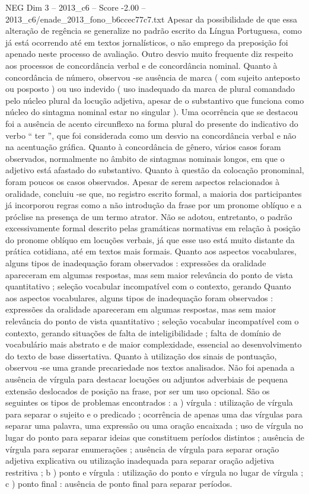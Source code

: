 \begin{textsample}{NEG Dim 3 – 2013\_c6 – Score -2.00 – 2013\_c6/enade\_2013\_fono\_b6ccec77c7.txt}
Apesar da possibilidade de que essa alteração de regência se generalize no padrão escrito da Língua Portuguesa, como já está ocorrendo até em textos jornalísticos, o não emprego da preposição foi apenado neste processo de avaliação.
Outro desvio muito frequente diz respeito aos processos de concordância verbal e de concordância nominal.
Quanto à concordância de número, observou -se ausência de marca ( com sujeito anteposto ou posposto ) ou uso indevido ( uso inadequado da marca de plural comandado pelo núcleo plural da locução adjetiva, apesar de o substantivo que funciona como núcleo do sintagma nominal estar no singular ).
Uma ocorrência que se destacou foi a ausência de acento circunflexo na forma plural do presente do indicativo do verbo “ ter ”, que foi considerada como um desvio na concordância verbal e não na acentuação gráfica.
Quanto à concordância de gênero, vários casos foram observados, normalmente no âmbito de sintagmas nominais longos, em que o adjetivo está afastado do substantivo.
Quanto à questão da colocação pronominal, foram poucos os casos observados.
Apesar de serem aspectos relacionados à oralidade, concluiu -se que, no registro escrito formal, a maioria dos participantes já incorporou regras como a não introdução da frase por um pronome oblíquo e a próclise na presença de um termo atrator.
Não se adotou, entretanto, o padrão excessivamente formal descrito pelas gramáticas normativas em relação à posição do pronome oblíquo em locuções verbais, já que esse uso está muito distante da prática cotidiana, até em textos mais formais.
Quanto aos aspectos vocabulares, alguns tipos de inadequação foram observados : expressões da oralidade apareceram em algumas respostas, mas sem maior relevância do ponto de vista quantitativo ; seleção vocabular incompatível com o contexto, gerando Quanto aos aspectos vocabulares, alguns tipos de inadequação foram observados : expressões da oralidade apareceram em algumas respostas, mas sem maior relevância do ponto de vista quantitativo ; seleção vocabular incompatível com o contexto, gerando situações de falta de inteligibilidade ; falta de domínio de vocabulário mais abstrato e de maior complexidade, essencial ao desenvolvimento do texto de base dissertativa.
Quanto à utilização dos sinais de pontuação, observou -se uma grande precariedade nos textos analisados.
Não foi apenada a ausência de vírgula para destacar locuções ou adjuntos adverbiais de pequena extensão deslocados de posição na frase, por ser um uso opcional.
São os seguintes os tipos de problemas encontrados : a ) vírgula : utilização de vírgula para separar o sujeito e o predicado ; ocorrência de apenas uma das vírgulas para separar uma palavra, uma expressão ou uma oração encaixada ; uso de vírgula no lugar do ponto para separar ideias que constituem períodos distintos ; ausência de vírgula para separar enumerações ; ausência de vírgula para separar oração adjetiva explicativa ou utilização inadequada para separar oração adjetiva restritiva ; b ) ponto e vírgula : utilização do ponto e vírgula no lugar de vírgula ; c ) ponto final : ausência de ponto final para separar períodos.

\end{textsample}
